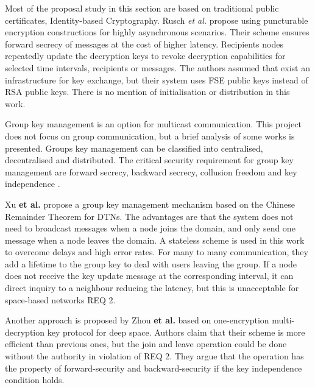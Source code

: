 Most of the proposal study in this section are based on traditional public certificates, Identity-based Cryptography. Rusch \textit{et al.}  \cite{rusch2017forward} propose using puncturable encryption constructions for highly asynchronous scenarios. Their scheme ensures forward secrecy of messages at the cost of higher latency. Recipients nodes repeatedly update the decryption keys to revoke decryption capabilities for selected time intervals, recipients or messages. The authors assumed that exist an infrastructure for key exchange, but their system uses FSE public keys instead of RSA public keys. There is no mention of initialisation or distribution in this work.


Group key management is an option for multicast communication. This project does not focus on group communication, but a brief analysis of some works is presented. Groups key management can be classified into centralised, decentralised and distributed. The critical security requirement for group key management are forward secrecy, backward secrecy, collusion freedom and key independence \cite{camtepe2005key}. 


Xu \textbf{et al.} \cite{xu2012chinese} propose a group key management mechanism based on the Chinese Remainder Theorem for DTNs. The advantages are that the system does not need to broadcast messages when a node joins the domain, and only send one message when a node leaves the domain. A stateless scheme is used in this work to overcome delays and high error rates. For many to many communication, they add a lifetime to the group key to deal with users leaving the group. If a node does not receive the key update message at the corresponding interval, it can direct inquiry to a neighbour reducing the latency, but this is unacceptable for space-based networks REQ 2.

Another approach is proposed by Zhou \textbf{et al.} \cite{zhou2014autonomic} based on one-encryption multi-decryption key protocol for deep space. Authors claim that their scheme is more efficient than previous ones, but the join and leave operation could be done without the authority in violation of REQ 2. They argue that the operation has the property of forward-security and backward-security if the key independence condition holds.
